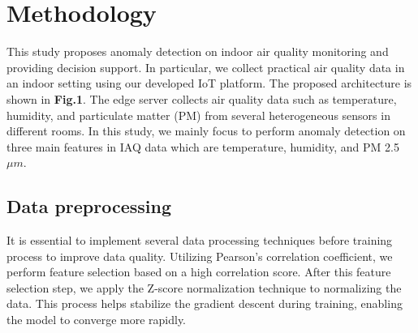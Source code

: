 \documentclass[final,3p,times,twocolumn]{elsarticle}
\begin{document}
\section{Methodology}\label{sec2}

This study proposes anomaly detection on indoor air quality monitoring and providing decision support. In particular, we collect practical air quality data in an indoor setting using our developed IoT platform. The proposed architecture is shown in \textbf{Fig.1}. The edge server collects air quality data such as temperature, humidity, and particulate matter (PM) from several heterogeneous sensors in different rooms. In this study, we mainly focus to perform anomaly detection on three main features in IAQ data which are temperature, humidity, and PM 2.5$\mu m$.

\subsection{Data preprocessing}
It is essential to implement several data processing techniques before training process to improve data quality. Utilizing Pearson's correlation coefficient, we perform feature selection based on a high correlation score.%
After this feature selection step, we apply the Z-score normalization technique to normalizing the data. This process helps stabilize the gradient descent during training, enabling the model to converge more rapidly.

\end{document}
